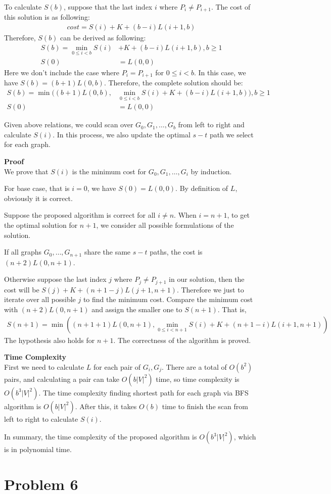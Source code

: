 \documentclass{article}
\newcommand{\Complexity}{\vspace{0.3cm} \noindent\textbf{Time Complexity} \\}
\newcommand{\Proof}{\vspace{0.3cm} \noindent\textbf{Proof} \\}
\begin{document}
To calculate $S(b)$, suppose that the last index $i$ where $P_i \neq P_{i+1}$. The cost of this
solution is as following:
\begin{align}
  cost = S(i) + K + (b - i)L(i+1, b)
\end{align}
Therefore, $S(b)$ can be derived as following:
\begin{align}
  S(b) = \min_{0\leq i < b} S(i) & + K + (b-i)L(i+1, b), b \geq 1\\
  S(0) &= L(0,0)
\end{align}
Here we don't include the case where $P_i = P_{i+1}$ for $ 0 \leq i < b$. In this case, we have 
$S(b) = (b+1)L(0, b)$. Therefore, the complete solution should be:
\begin{align}
  S(b) = \min((b+1)L(0,b), & \min_{0\leq i < b} S(i) + K + (b-i)L(i+1, b)), b\geq 1 \\
  S(0) &= L(0, 0)
\end{align}

Given above relations, we could scan over $G_0, G_1, \dots, G_b$ from left to right and calculate 
$S(i)$. In this process, we also update the optimal $s-t$ path we select for each graph. 

\Proof
We prove that $S(i)$ is the minimum cost for $G_0, G_1, \dots, G_i$ by induction.

For base case, that is $i=0$, we have $S(0) = L(0,0)$. By definition of $L$, obviously it is
correct.

Suppose the proposed algorithm is correct for all $i \neq n$. When $i = n+1$, to get the optimal
solution for $n+1$, we consider all possible formulations of the solution. 

If all graphs $G_0, \dots, G_{n+1}$ share the same $s-t$ paths, the cost is $(n+2)L(0, n+1)$.

Otherwise suppose the last index 
$j$ where $P_j \neq P_{j+1}$ in our solution, then the cost will be $S(j) + K + (n+1-j) L(j+1,
n+1)$. Therefore we just to iterate over all possible $j$ to find the minimum cost. Compare the
minimum cost with $(n+2)L(0,n+1)$ and assign the smaller one to $S(n+1)$. That is,
\begin{align}
  S(n+1) = \min((n+1+1)L(0,n+1), \min_{0\leq i < n+1} S(i) + K + (n+1-i)L(i+1, n+1))
\end{align}
The hypothesis also holds for $n+1$. The correctness of the algorithm is proved.

\Complexity
First we need to calculate $L$ for each pair of $G_i, G_j$. There are a total of $O(b^2)$ pairs, and
calculating a pair can take $O(b|V|^2)$ time, so time complexity is $O(b^3 |V|^2)$. 
The time complexity finding shortest path for each graph via BFS algorithm is $O(b|V|^2)$.
After this, it takes $O(b)$ time to finish the scan from left to right to calculate $S(i)$. 

In summary, the time complexity of the proposed algorithm is $O(b^3 |V|^2)$, which is in polynomial
time.

\section*{Problem 6}
\end{document}
